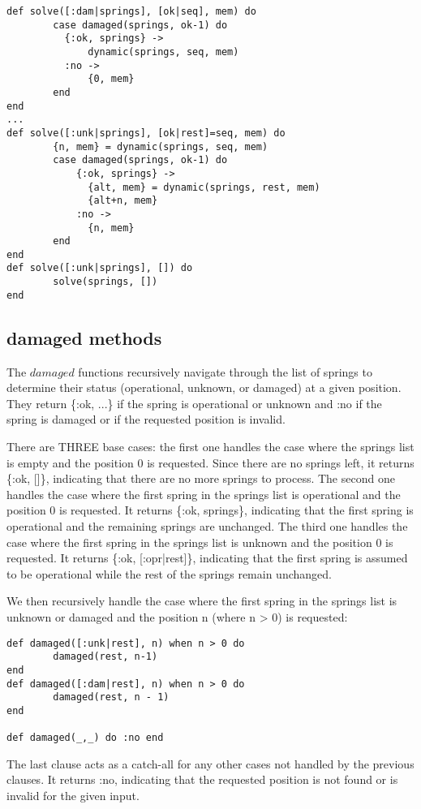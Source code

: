 \documentclass[a4paper,11pt]{article}
\begin{document}
\begin{verbatim}
def solve([:dam|springs], [ok|seq], mem) do
        case damaged(springs, ok-1) do
          {:ok, springs} ->
              dynamic(springs, seq, mem)
          :no ->
              {0, mem}
        end
end
...
def solve([:unk|springs], [ok|rest]=seq, mem) do
        {n, mem} = dynamic(springs, seq, mem)
        case damaged(springs, ok-1) do
            {:ok, springs} ->
              {alt, mem} = dynamic(springs, rest, mem)
              {alt+n, mem}
            :no ->
              {n, mem}
        end
end
def solve([:unk|springs], []) do
        solve(springs, [])
end
\end{verbatim}

\subsection*{damaged methods}
The $damaged$ functions recursively navigate through the list of springs to determine their status (operational, unknown, or damaged) at a given position. They return \{:ok, ...\} if the spring is operational or unknown and :no if the spring is damaged or if the requested position is invalid.

There are THREE base cases: the first one handles the case where the springs list is empty and the position 0 is requested. Since there are no springs left, it returns \{:ok, {[]}\}, indicating that there are no more springs to process. The second one handles the case where the first spring in the springs list is operational and the position 0 is requested. It returns \{:ok, springs\}, indicating that the first spring is operational and the remaining springs are unchanged. The third one handles the case where the first spring in the springs list is unknown and the position 0 is requested. It returns \{:ok, {[:opr|rest]}\}, indicating that the first spring is assumed to be operational while the rest of the springs remain unchanged.

We then recursively handle the case where the first spring in the springs list is unknown or damaged and the position n (where n > 0) is requested:

\begin{verbatim}
def damaged([:unk|rest], n) when n > 0 do
        damaged(rest, n-1)
end
def damaged([:dam|rest], n) when n > 0 do
        damaged(rest, n - 1)
end

def damaged(_,_) do :no end
\end{verbatim} 
The last clause acts as a catch-all for any other cases not handled by the previous clauses. It returns :no, indicating that the requested position is not found or is invalid for the given input.
\end{document}
